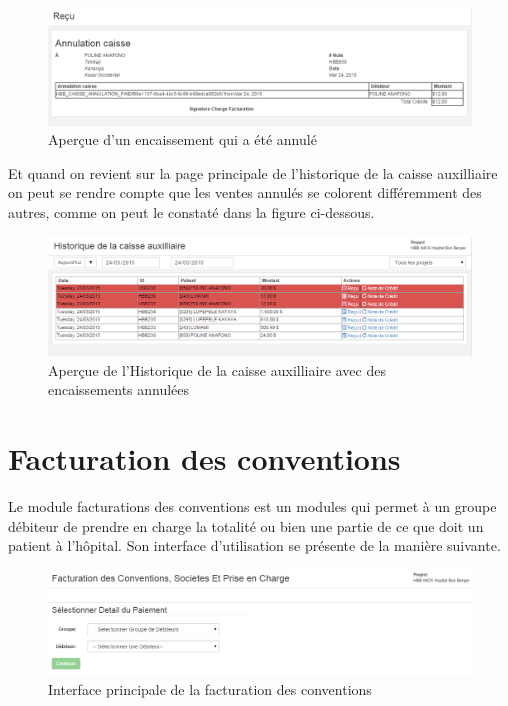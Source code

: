\documentclass[12pt,a4paper]{report}
\begin{document}
\begin{figure}[h]
\begin{center}
\includegraphics[width=14cm]{pic/InvoAnnCaiAux.png}
\end{center}
\caption{Aperçue d'un encaissement qui a été annulé}
\label{Aperçue d'un encaissement qui a été annulé}
\end{figure}

Et quand on revient sur la page principale de l'historique de la caisse auxilliaire on peut se rendre compte que les ventes annulés se colorent différemment des autres, comme on peut le constaté dans la figure ci-dessous.

\begin{figure}[h]
\begin{center}
\includegraphics[width=14cm]{pic/HisCaissDellOk.png}
\end{center}
\caption{Aperçue de l'Historique de la caisse auxilliaire avec des encaissements annulées}
\label{Aperçue de l'Historique de la caisse auxilliaire avec des encaissements annulées}
\end{figure}


\newpage
\section{Facturation des conventions}
Le module facturations des conventions est un modules qui permet à un groupe débiteur de prendre en charge la totalité ou bien une partie de ce que doit un patient à l'hôpital. Son interface d'utilisation se présente de la manière suivante.

\begin{figure}[h]
\begin{center}
\includegraphics[width=14cm]{pic/FacturationConv.png}
\end{center}
\caption{Interface principale de la facturation des conventions}
\label{Interface principale de la facturation des conventions}
\end{figure}
\end{document}
